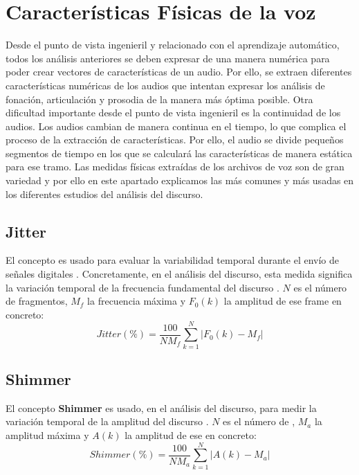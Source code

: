 \section{Características Físicas de la voz} \label{sec:ccas}
Desde el punto de vista ingenieril y relacionado con el aprendizaje automático, todos los análisis anteriores se deben expresar de una manera numérica para poder crear vectores de características de un audio. Por ello, se extraen diferentes características numéricas de los audios que intentan expresar los análisis de fonación, articulación y prosodia de la manera más óptima posible. Otra dificultad importante desde el punto de vista ingenieril es la continuidad de los audios. Los audios cambian de manera continua en el tiempo, lo que complica el proceso de la extracción de características. Por ello, el audio se divide pequeños segmentos de tiempo en los que se calculará las características de manera estática para ese tramo. Las medidas físicas extraídas de los archivos de voz son de gran variedad y por ello en este apartado explicamos las más comunes y más usadas en los diferentes estudios del análisis del discurso. 

\subsection{Jitter}
El concepto  es usado para evaluar la variabilidad temporal durante el envío de señales digitales \cite{wiki:jitter}. Concretamente, en el análisis del discurso, esta medida significa la variación temporal de la frecuencia fundamental del discurso \cite{neurospeech}. $N$ es el número de fragmentos, $M_{f}$ la frecuencia máxima y $F_{0}(k)$ la amplitud de ese frame en concreto:
\begin{equation}
\mathit{Jitter}(\%) = \frac{100}{N M_{f}} \sum_{k=1}^{N}|F_{0}(k)-M_{f}|
\end{equation}

\subsection{Shimmer}
El concepto \textbf{Shimmer} es usado, en el análisis del discurso, para medir la variación temporal de la amplitud del discurso \cite{neurospeech}. $N$ es el número de , $M_{a}$ la amplitud máxima y $A(k)$ la amplitud de ese  en concreto:
\begin{equation}
\mathit{Shimmer}(\%) = \frac{100}{N M_{a}} \sum_{k=1}^{N}|A(k)-M_{a}|
\end{equation}

